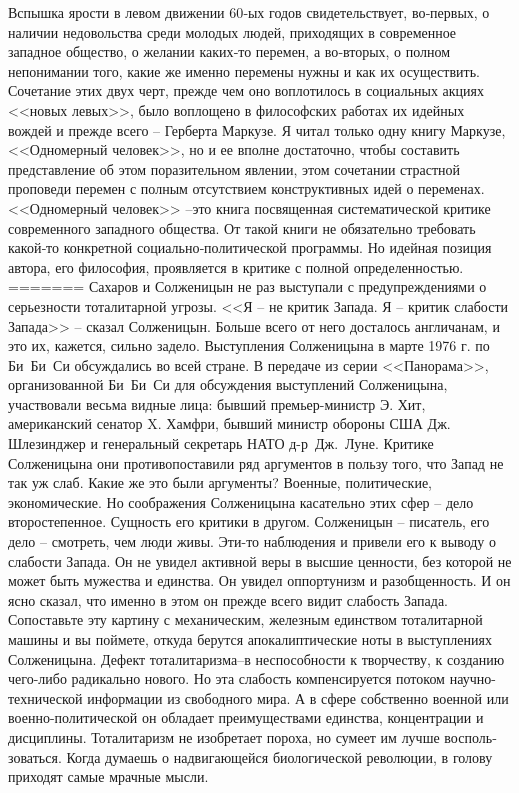 \documentclass{book}
\begin{document}
{Вспышка ярости в левом движении 60‑ых годов свидетель­ствует, во‑первых, о наличии недовольства среди молодых лю­дей, приходящих в современное западное общество, о жела­нии каких‑то перемен, а во‑вторых, о полном непонимании то­го, какие же именно перемены нужны и как их осуществить. Сочетание этих двух черт, прежде чем оно воплотилось в социальных акциях <<новых левых>>, было воплощено в философских работах их идейных вождей и прежде всего -- Герберта Маркузе. Я читал только одну книгу Маркузе, <<Одномерный человек>>, но и ее вполне достаточно, чтобы составить представление об этом поразительном явлении, этом сочетании страстной проповеди перемен с полным отсутствием конструктивных идей о переменах. <<Одномерный человек>> --это книга посвященная систематической критике современного западного общества. От такой книги не обязательно требовать какой‑то конкретной социально‑политической программы. Но идейная позиция автора, его философия, проявляется в критике с полной определенностью.
=======
Сахаров и Солженицын не раз выступали с предупреждениями о серьезности тоталитарной угрозы. <<Я -- не критик Запада. Я -- критик слабости Запада>> -- сказал Солженицын. Больше всего от него досталось англичанам, и это их, кажется, сильно задело. Выступления Солженицына в марте 1976 г. по Би~Би~Си обсуждались во всей стране. В передаче из серии <<Панорама>>, организованной Би~Би~Си для обсуждения выступлений Солженицына, участвовали весьма видные лица: бывший премьер-министр Э. Хит, американский сенатор X. Хамфри, бывший министр обороны США Дж. Шлезинджер и генераль­ный секретарь НАТО д-р~Дж.~Луне. Критике Солженицына они противопоставили ряд аргументов в пользу того, что Запад не так уж слаб. Какие же это были аргументы? Военные, политические, экономические. Но соображения Солженицына касательно этих сфер -- дело второстепенное. Сущность его кри­тики в другом. Солженицын -- писатель, его дело -- смотреть, чем люди живы. Эти-то наблюдения и привели его к выводу о слабости Запада. Он не увидел активной веры в 
высшие цен­ности, без которой не может быть мужества и единства. Он уви­дел оппортунизм и разобщенность. И он ясно сказал, что имен­но в этом он прежде всего видит слабость Запада. Сопоставь­те эту картину с механическим, железным единством тотали­тарной машины и вы поймете, откуда берутся апокалиптические ноты в выступлениях Солженицына. Дефект тоталитариз­ма--в неспособности к творчеству, к созданию чего-либо ради­кально нового. Но эта слабость компенсируется потоком науч­но-технической информации из свободного мира. А в сфере собственно военной или военно-политической он обладает преимуществами единства, концентрации и дисциплины. То­талитаризм не изобретает пороха, но сумеет им лучше восполь­зоваться. Когда думаешь о надвигающейся биологической ре­волюции, в голову приходят самые мрачные мысли.

}
\end{document}
